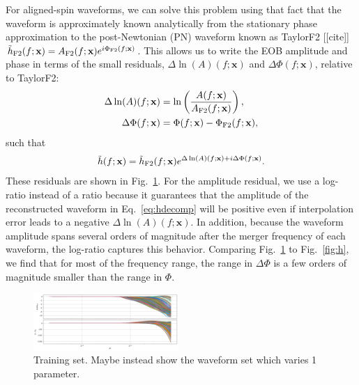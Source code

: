 \documentclass[prd,aps,letter,twocolumn,floatfix,notitlepage,nofootinbib]{revtex4-1}
\def\bx{\mathbf{x}}
\begin{document}
For aligned-spin waveforms, we can solve this problem using that fact that the waveform is approximately known analytically from the stationary phase approximation to the post-Newtonian (PN) waveform known as TaylorF2 [[cite]] $\tilde h_{\rm F2}(f; \bx) = A_{\rm F2}(f; \bx) e^{i\Phi_{\rm F2} (f; \bx)}$. This allows us to write the EOB amplitude and phase in terms of the small residuals, $\Delta\ln(A)(f; \bx)$ and $\Delta\Phi(f; \bx)$, relative to TaylorF2:
\begin{align}
\Delta\ln(A)(f; \bx) &= \ln\left(\frac{ A(f; \bx) }{ A_{\rm F2}(f; \bx)}\right), \label{eq:ampres}\\
\Delta\Phi(f; \bx) & = \Phi(f; \bx) - \Phi_{\rm F2}(f; \bx), \label{eq:phaseres}
\end{align}
such that
\begin{align}
\tilde h(f; \bx) = \tilde h_{\rm F2}(f; \bx) e^{\Delta\ln(A)(f; \bx) + i  \Delta\Phi(f; \bx)}.
\label{eq:hdecomp}
\end{align}
These residuals are shown in Fig.~\ref{fig:dh}. For the amplitude residual, we use a log-ratio instead of a ratio because it guarantees that the amplitude of the reconstructed waveform in Eq.~\eqref{eq:hdecomp} will be positive even if interpolation error leads to a negative $\Delta\ln(A)(f; \bx)$. In addition, because the waveform amplitude spans several orders of magnitude after the merger frequency of each waveform, the log-ratio captures this behavior. Comparing Fig.~\ref{fig:dh} to Fig.~\ref{fig:h}, we find that for most of the frequency range, the range in $\Delta\Phi$ is a few orders of magnitude smaller than the range in $\Phi$.

\begin{figure}[htb]
\centering
\includegraphics[width=0.49\textwidth]{dh_trainingset.png}
\caption{Training set. Maybe instead show the waveform set which varies 1 parameter.}
\label{fig:dh}
\end{figure}
\end{document}
